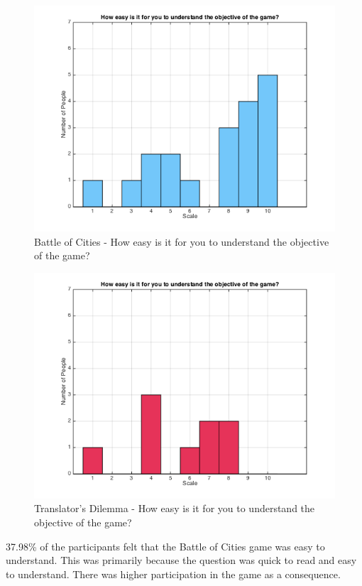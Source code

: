 \documentclass{sig-alternate}
\begin{document}
\begin{figure}
	\includegraphics[width=\linewidth]{p_easy_understand.png}
	\caption{Battle of Cities - How easy is it for you to understand the objective of the game?}
	\label{fig:p_easy_understand}
\end{figure}

\begin{figure}
	\includegraphics[width=\linewidth]{t_easy_understand.png}
	\caption{Translator's Dilemma - How easy is it for you to understand the objective of the game?}
	\label{fig:t_easy_understand}
\end{figure}

37.98\% of the participants felt that the Battle of Cities game was easy to understand. This was primarily because the question was quick to read and easy to understand. There was higher participation in the game as a consequence.
\end{document}
